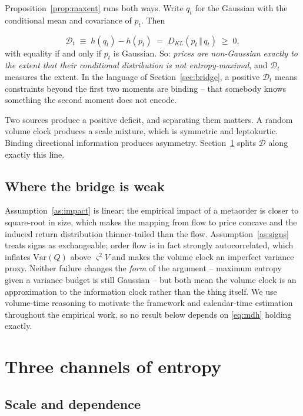 \documentclass[11pt]{article}
\theoremstyle{definition}
\theoremstyle{remark}
\newcommand{\DD}{\mathcal{D}}
\newcommand{\KL}[2]{D_{KL}\!\left(#1\,\Vert\,#2\right)}
\begin{document}
Proposition~\ref{prop:maxent} runs both ways. Write $q_t$ for the Gaussian with
the conditional mean and covariance of $p_t$. Then

\begin{equation}
\label{eq:deficit}
\DD_t \;\equiv\; h(q_t) - h(p_t) \;=\; \KL{p_t}{q_t} \;\ge\; 0,
\end{equation}
with equality if and only if $p_t$ is Gaussian. So: \emph{prices are non-Gaussian
exactly to the extent that their conditional distribution is not
entropy-maximal}, and $\DD_t$ measures the extent. In the language of
Section~\ref{sec:bridge}, a positive $\DD_t$ means constraints beyond the first
two moments are binding -- that somebody knows something the second moment does
not encode.

Two sources produce a positive deficit, and separating them matters. A random
volume clock produces a scale mixture, which is symmetric and leptokurtic.
Binding directional information produces asymmetry. Section~\ref{sec:channels}
splits $\DD$ along exactly this line.

\subsection{Where the bridge is weak}
\label{sec:bridge-caveats}

Assumption~\ref{as:impact} is linear; the empirical impact of a metaorder is
closer to square-root in size, which makes the mapping from flow to price
concave and the induced return distribution thinner-tailed than the flow.
Assumption~\ref{as:signs} treats signs as exchangeable; order flow is in fact
strongly autocorrelated, which inflates $\mathrm{Var}(Q)$ above $\varsigma^2 V$
and makes the volume clock an imperfect variance proxy. Neither failure changes
the \emph{form} of the argument -- maximum entropy given a variance budget is
still Gaussian -- but both mean the volume clock is an approximation to the
information clock rather than the thing itself. We use volume-time reasoning to
motivate the framework and calendar-time estimation throughout the empirical
work, so no result below depends on \eqref{eq:mdh} holding exactly.

\section{Three channels of entropy}
\label{sec:channels}

\subsection{Scale and dependence}
\end{document}
